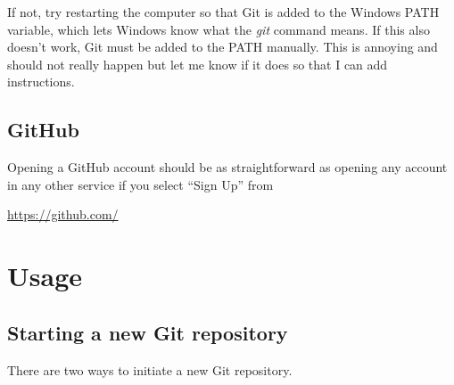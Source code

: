 \documentclass[a4paper,10pt]{article}
\begin{document}
If not, try restarting the computer so that Git is added to the Windows PATH variable, which lets Windows know what the \emph{git} command means. If this also doesn't work, Git must be added to the PATH manually. This is annoying and should not really happen but let me know if it does so that I can add instructions.

\subsection{GitHub}

Opening a GitHub account should be as straightforward as opening any account in any other service if you select ``Sign Up'' from 

\url{https://github.com/}


\section{Usage}

\subsection{Starting a new Git repository}

There are two ways to initiate a new Git repository.
\end{document}
